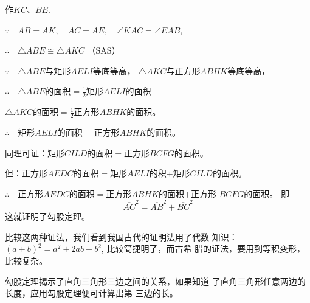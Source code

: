 作$\overline{KC}$、$\overline{BE}$.

$\because\quad \overline{AB}=\overline{AK},\quad \overline{AC}=\overline{AE},\quad \angle KAC=\angle EAB$,

$\therefore\quad \triangle ABE\cong \triangle AKC$ （SAS）

$\because\quad \triangle ABE$与矩形$AELI$等底等高，
$\triangle AKC$与正方形$ABHK$等底等高，

$\therefore\quad \triangle ABE$的面积$=\frac{1}{2}$矩形$AELI$的面积

$\triangle AKC$的面积$=\frac{1}{2}$正方形$ABHK$的面积。

$\therefore\quad $矩形$AELI$的面积$=$正方形$ABHK$的面积。

同理可证：矩形$CILD$的面积$=$正方形$BCFG$的面积。

但：正方形$AEDC$的面积$=$矩形$AELI$的积$+$矩形$CILD$的面积。

$\therefore\quad $正方形$AEDC$的面积$=$正方形$ABHK$的面积$+$正方形
$BCFG$的面积。
即
\[\overline{AC}^2=\overline{AB}^2+\overline{BC}^2\]
这就证明了勾股定理。

比较这两种证法，我们看到我国古代的证明法用了代数
知识：$(a+b)^2=a^2+2ab+b^2$, 比较简捷明了，而古希
腊的证法，要用到等积变形，比较复杂。

勾股定理揭示了直角三角形三边之间的关系，如果知道
了直角三角形任意两边的长度，应用勾股定理便可计算出第
三边的长。

















\begin{blk}
    
\end{blk}



\begin{solution}
    
\end{solution}


\begin{blk}
    
\end{blk}

